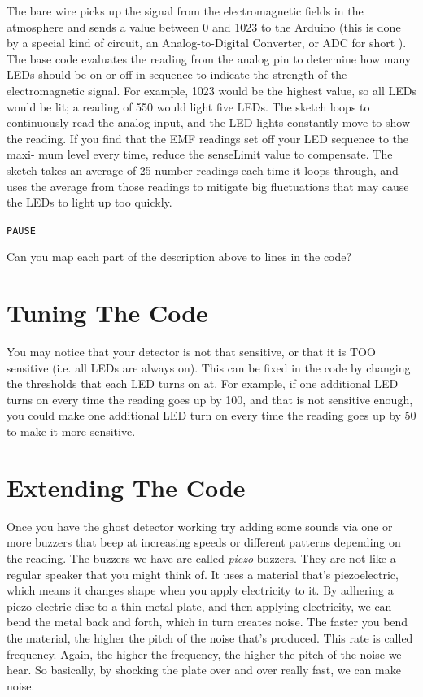 \documentclass[11pt]{article}
\begin{document}
The bare wire picks up the signal from the electromagnetic fields in the atmosphere and sends a value between 0 and 1023
to the Arduino (this is done by a special kind of circuit, an Analog-to-Digital Converter, or ADC for short ). The base
code evaluates the reading from the analog pin to determine how many LEDs should be on or off in sequence to indicate
the strength of the electromagnetic signal. For example, 1023 would be the highest value, so all LEDs would be lit; a
reading of 550 would light five LEDs. The sketch loops to continuously read the analog input, and the LED lights
constantly move to show the reading. If you find that the EMF readings set off your LED sequence to the maxi- mum level
every time, reduce the senseLimit value to compensate.  The sketch takes an average of 25 number readings each time it
loops through, and uses the average from those readings to mitigate big fluctuations that may cause the LEDs to light up
too quickly.

\texttt{PAUSE}

Can you map each part of the description above to lines in the code?

\section{Tuning The Code}
\label{sec:org9593334}

You may notice that your detector is not that sensitive, or that it is TOO sensitive (i.e. all LEDs are always on). This
can be fixed in the code by changing the thresholds that each LED turns on at. For example, if one additional LED turns
on every time the reading goes up by 100, and that is not sensitive enough, you could make one additional LED turn on
every time the reading goes up by 50 to make it more sensitive.


\section{Extending The Code}
\label{sec:org97f2b16}

Once you have the ghost detector working try adding some sounds via one or more buzzers that beep at increasing speeds
or different patterns depending on the reading. The buzzers we have are called \emph{piezo} buzzers. They are not like a
regular speaker that you might think of. It uses a material that’s piezoelectric, which means it changes shape when you
apply electricity to it. By adhering a piezo-electric disc to a thin metal plate, and then applying electricity, we can
bend the metal back and forth, which in turn creates noise. The faster you bend the material, the higher the pitch of
the noise that’s produced. This rate is called frequency. Again, the higher the frequency, the higher the pitch of the
noise we hear. So basically, by shocking the plate over and over really fast, we can make noise.
\end{document}
